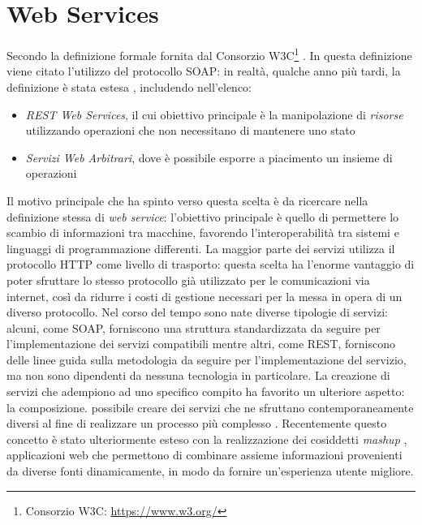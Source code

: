 \section{Web Services\label{sec:web-services}}

Secondo la definizione formale fornita dal Consorzio W3C\footnote{Consorzio W3C: \url{https://www.w3.org/}}  \cite{world2004web}. In questa definizione viene citato l'utilizzo del protocollo SOAP: in realtà, qualche anno più tardi, la definizione è stata estesa \cite{w3c2004web}, includendo nell'elenco:

\begin{itemize}
	\item \emph{REST Web Services}, il cui obiettivo principale è la manipolazione di \emph{risorse} utilizzando operazioni che non necessitano di mantenere uno stato
	\item \emph{Servizi Web Arbitrari}, dove è possibile esporre a piacimento un insieme di operazioni
\end{itemize}

Il motivo principale che ha spinto verso questa scelta è da ricercare nella definizione stessa di \emph{web service}: l'obiettivo principale è quello di permettere lo scambio di informazioni tra macchine, favorendo l'interoperabilità tra sistemi e linguaggi di programmazione differenti. La maggior parte dei servizi utilizza il protocollo HTTP come livello di trasporto: questa scelta ha l'enorme vantaggio di poter sfruttare lo stesso protocollo già utilizzato per le comunicazioni via internet, così da ridurre i costi di gestione necessari per la messa in opera di un diverso protocollo. Nel corso del tempo sono nate diverse tipologie di servizi: alcuni, come SOAP, forniscono una struttura standardizzata da seguire per l'implementazione dei servizi compatibili mentre altri, come REST, forniscono delle linee guida sulla metodologia da seguire per l'implementazione del servizio, ma non sono dipendenti da nessuna tecnologia in particolare. La creazione di servizi che adempiono ad uno specifico compito ha favorito un ulteriore aspetto: la composizione. \upe possibile creare dei servizi che ne sfruttano contemporaneamente diversi al fine di realizzare un processo più complesso \cite{weerawarana2005web}. Recentemente questo concetto è stato ulteriormente esteso con la realizzazione dei cosiddetti \emph{mashup} \cite{benslimane2008services}, applicazioni web che permettono di combinare assieme informazioni provenienti da diverse fonti dinamicamente, in modo da fornire un'esperienza utente migliore.

